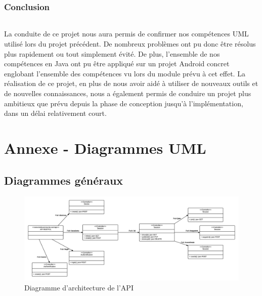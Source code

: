 \documentclass[titlepage, 12pt]{report}
\begin{document}
\section{Conclusion}

\paragraph{}La conduite de ce projet nous aura permis de confirmer nos compétences UML utilisé lors du projet précédent. De nombreux problèmes ont pu donc être résolus plus rapidement ou tout simplement évité.
De plus, l'ensemble de nos compétences en Java ont pu être appliqué sur un projet Android concret englobant l'ensemble des compétences vu lors du module prévu à cet effet.
La réalisation de ce projet, en plus de nous avoir aidé à utiliser de nouveaux outils et de nouvelles connaissances, nous a également permis de conduire un projet plus ambitieux que prévu depuis la phase de conception jusqu'à l'implémentation, dans un délai relativement court. 


\part{Annexe - Diagrammes UML}

\chapter{Diagrammes généraux}

\begin{figure}[!h]
	\caption{Diagramme d'architecture de l'API}
	\label{API_architecture}
	\centering
	\includegraphics[scale=0.5]{Images/diagram/API_architecture.png}
\end{figure}
\end{document}
